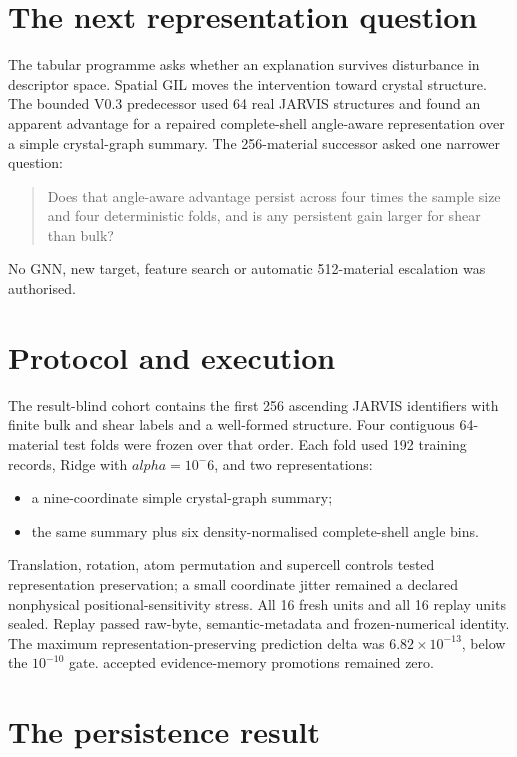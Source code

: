 \documentclass[11pt,a4paper,oneside]{report}
\begin{document}
\section{The next representation question}

The tabular programme asks whether an explanation survives disturbance in
descriptor space. Spatial GIL moves the intervention toward crystal structure.
The bounded V0.3 predecessor used 64 real JARVIS structures and found an apparent
advantage for a repaired complete-shell angle-aware representation over a simple
crystal-graph summary. The 256-material successor asked one narrower question:

\begin{quote}
Does that angle-aware advantage persist across four times the sample size and
four deterministic folds, and is any persistent gain larger for shear than bulk?
\end{quote}

No GNN, new target, feature search or automatic 512-material escalation was
authorised.

\section{Protocol and execution}

The result-blind cohort contains the first 256 ascending JARVIS identifiers with
finite bulk and shear labels and a well-formed structure. Four contiguous
64-material test folds were frozen over that order. Each fold used 192 training
records, Ridge with $alpha=10^-6$, and two representations:

\begin{itemize}
\item a nine-coordinate simple crystal-graph summary;
\item the same summary plus six density-normalised complete-shell angle bins.
\end{itemize}

Translation, rotation, atom permutation and supercell controls tested
representation preservation; a small coordinate jitter remained a declared
nonphysical positional-sensitivity stress. All 16 fresh units and all 16 replay
units sealed. Replay passed raw-byte, semantic-metadata and frozen-numerical
identity. The maximum representation-preserving prediction delta was
$6.82\times10^{-13}$, below the $10^{-10}$ gate. accepted evidence-memory promotions remained zero.

\section{The persistence result}
\end{document}
